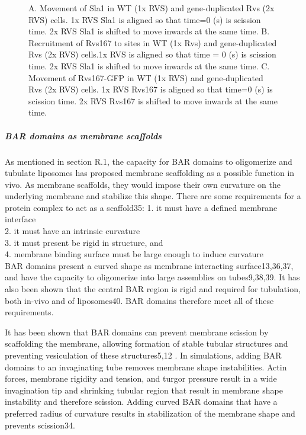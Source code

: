 \begin{figure}[H]
	\caption[Dynamics of endocytosis in diploid strains with gene duplicated Rvs]
	{A. Movement of Sla1 in WT (1x RVS) and gene-duplicated Rvs (2x RVS) cells. 1x RVS Sla1 is aligned so that time=0 (s) is scission time. 2x RVS Sla1 is shifted to move inwards at the same time.
		B. Recruitment of Rvs167 to sites in WT (1x Rvs)  and gene-duplicated Rvs (2x RVS) cells.1x RVS is aligned so that time = 0 (s) is scission time. 2x RVS Sla1 is shifted to move inwards at the same time.
		C.  Movement of Rvs167-GFP in WT (1x RVS) and gene-duplicated Rvs (2x RVS) cells. 1x RVS Rvs167 is aligned so that time=0 (s) is scission time. 2x RVS Rvs167 is shifted to move inwards at the same time.
		\label{fig_rvsdiploid}}
\end{figure}


\newpage
	\subparagraph{BAR domains as membrane scaffolds}
	As mentioned in section R.1, the capacity for BAR domains to oligomerize and tubulate liposomes has proposed membrane scaffolding as a possible function in vivo. As membrane scaffolds, they would impose their own curvature on the underlying membrane and stabilize this shape. There are some requirements for a protein complex to act as a scaffold35:
	1. it must have a defined membrane interface\\
	2. it must have an intrinsic curvature\\
	3. it must present be rigid in structure, and\\
	4. membrane binding surface must be large enough to induce curvature\\

BAR domains present a curved shape as membrane interacting surface13,36,37, and have the capacity to oligomerize into large assemblies on tubes9,38,39. It has also been shown that the central BAR region is rigid and required for tubulation, both in-vivo and of liposomes40. BAR domains therefore meet all of these requirements. 
	
It has been shown that BAR domains can prevent membrane scission by scaffolding the membrane, allowing formation of stable tubular structures and preventing vesiculation of these structures5,12 . In simulations, adding BAR domains to an invaginating tube removes membrane shape instabilities. Actin forces, membrane rigidity and tension, and turgor pressure result in a wide invagination tip and shrinking tubular region that result in membrane shape instability and therefore scission. Adding curved BAR domains that have a preferred radius of curvature results in stabilization of the membrane shape and prevents scission34.

